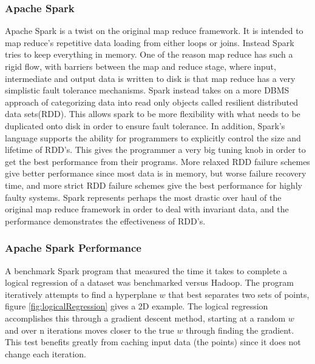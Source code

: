 \documentclass[10pt,twocolumn]{IEEEtran11}
\begin{document}
\subsubsection{Apache Spark}
Apache Spark is a twist on the original map reduce framework.  It is intended to map reduce's repetitive data loading from either loops or joins.  Instead Spark tries to keep everything in memory.   One of the reason map reduce has such a rigid flow, with barriers between the map and reduce stage, where input, intermediate and output data is written to disk is that map reduce has a very simplistic fault tolerance mechanisms.  Spark instead takes on a more DBMS approach of categorizing data into read only objects called resilient distributed data sets(RDD).  This allows spark to be more flexibility with what needs to be duplicated onto disk in order to ensure fault tolerance.  In addition, Spark's language supports the ability for programmers to explicitly control the size and lifetime of RDD's.  This gives the programmer a very big tuning knob in order to get the best performance  from their programs. More relaxed RDD failure schemes give better performance since most data is in memory, but worse failure recovery time, and more strict RDD failure schemes give the best performance for highly faulty systems.  Spark represents perhaps the most drastic over haul of the original map reduce framework in order to deal with invariant data, and the performance demonstrates the effectiveness of RDD's.


\subsubsection{Apache Spark Performance}

A benchmark Spark program that measured the time it takes to complete a logical regression of a dataset was benchmarked versus Hadoop.  The program iteratively attempts to find a hyperplane $w$ that best separates two sets of points, figure \ref{fig:logicalRegression} gives a 2D example.   The logical regression accomplishes this through a gradient descent method, starting at a random $w$ and over n iterations moves closer to the true $w$ through finding the gradient.  This test benefits greatly from caching input data (the points) since it does not change each iteration.
\end{document}
